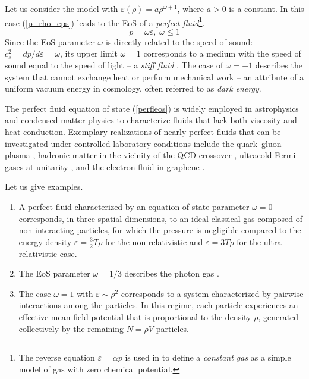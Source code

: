 \documentclass[a4paper,12pt]{amsart}
\theoremstyle{definition}
\theoremstyle{remark}
\begin{document}
Let us consider the model with $\varepsilon(\rho)=a \rho^{\omega +1}$, where $a>0$ is a constant. In this case (\ref{p_rho_eps}) leads to the EoS of a {\it perfect fluid}\footnote{The reverse equation $\varepsilon=\alpha p$ is used in \cite{Blaschke2026} to define a {\it constant gas} as a simple model of gas with zero chemical potential.}.
\begin{equation}\label{perfleos}
 p= \omega \varepsilon ,\;\omega\leq 1      
\end{equation}
Since the EoS parameter $\omega$ is directly related to the speed of sound: $c_s^2=dp/d\varepsilon=\omega$, its upper limit $\omega=1$ corresponds to a medium with the speed of sound equal to the speed of light  -- a {\it stiff fluid} \cite{Zeldovich:1961sbr}. The case of $\omega=-1$ describes the system that cannot exchange heat or perform mechanical work -- an attribute of a uniform vacuum energy in cosmology, often referred to as {\it dark energy}\cite{BlanTh}.

The perfect fluid equation of state (\ref{perfleos}) is widely employed in astrophysics and condensed matter physics to characterize fluids that lack both viscosity and heat conduction. Exemplary realizations of nearly perfect fluids that can be investigated under controlled laboratory conditions include the quark–gluon plasma \cite{Schafer:2009dj}, hadronic matter in the vicinity of the QCD crossover \cite{Rafelski:2015xej, Schafer:2009dj}, ultracold Fermi gases at unitarity \cite{Giorgini:2008zz}, and the electron fluid in graphene \cite{mueller2009}.

Let us give examples.
\begin{enumerate}[label=(\roman*), leftmargin=*]
\item A perfect fluid characterized by an equation-of-state parameter \(\omega = 0\) corresponds, in three spatial dimensions, to an ideal classical gas composed of non-interacting particles, for which the pressure is negligible compared to the energy density $\varepsilon=\frac{3}{2}T\rho$ for the non-relativistic and   $\varepsilon=3T\rho$ for the ultra-relativistic case.
\item The EoS parameter $\omega=1/3$ describes the photon gas \cite{Lanlif, BlanTh}.
\item  The case $\omega = 1$ with $\varepsilon \sim \rho^2$ corresponds to a system characterized by pairwise interactions among the particles. In this regime, each particle experiences an effective mean-field potential that is proportional to the density $\rho$, generated collectively by the remaining $N=\rho V$ particles.
 \end{enumerate} 
\end{document}
